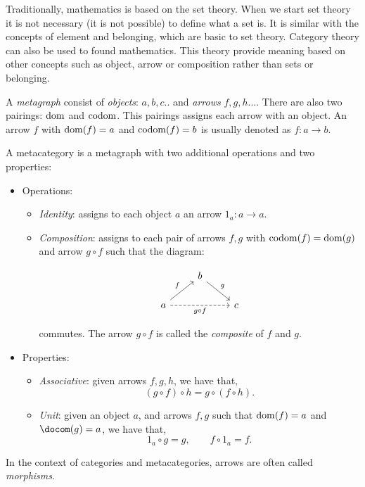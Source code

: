 Traditionally, mathematics is based on the set theory. When we start set theory it is not necessary (it is not possible) to define what a set is. It is similar with the concepts of element and belonging, which are basic to set theory. Category theory can also be used to found mathematics. This theory provide meaning based on other concepts such as object, arrow or composition rather than sets or belonging. \\

\begin{definition} \label{def:metagraph}
  A \emph{metagraph} consist of \emph{objects}: $a,b,c..$ and \emph{arrows} $f,g,h...$. There are also two pairings: $\operatorname{dom}$ and $\operatorname{codom}$. This pairings assigns each arrow with an object. An arrow $f$ with $\operatorname{dom}(f)=a$ and $\operatorname{codom}(f)=b$ is usually denoted as $f:a\to b$.\\
\end{definition}

\begin{definition}
  A metacategory  is a metagraph with two additional operations and two properties:
  \begin{itemize}
  \item Operations:
    \begin{itemize}
      
    \item \emph{Identity}: assigns to each object $a$ an arrow $1_a:a\to a$. 
    \item \emph{Composition}: assigns to each pair of arrows $f,g$ with $\operatorname{codom}(f)=\operatorname{dom}(g)$ and arrow $g\circ f$ such that the diagram:

      \[
        \begin{tikzcd}
          & b \arrow[rd, "g"]& \\
          a\arrow[ru, "f"] \arrow[rr, "g\circ f",swap, dashed] && c
        \end{tikzcd}
      \]

      commutes. The arrow $g\circ f$ is called the \emph{composite} of $f$  and $g$.
    \end{itemize}

  \item Properties:
    \begin{itemize}
    \item \emph{Associative}: given arrows $f,g,h$, we have that,
      $$(g\circ f) \circ h = g \circ (f \circ h).$$
    \item \emph{Unit}: given an object $a$, and arrows $f,g$ such that $\operatorname{dom} (f)= a$ and $\docom (g) = a$, we have that,
      $$1_a \circ g = g, \qquad f \circ 1_a = f.$$
    \end{itemize}
  \end{itemize}
  In the context of categories and metacategories, arrows are often called \emph{morphisms}.
\end{definition}


